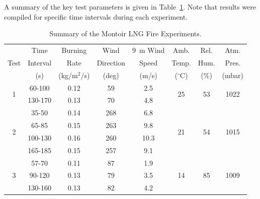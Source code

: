 A summary of the key test parameters is given in Table~\ref{Montoir_Summary}. Note that results were compiled for specific time intervals during each experiment.

\begin{table}[!ht]
\centering
\caption[Summary of the Montoir LNG Fire Experiments]{Summary of the Montoir LNG Fire Experiments.}
\label{Montoir_Summary}
\begin{tabular}{|c|c|c|c|c|c|c|c|}
\hline
                            & Time    & Burning      & Wind      & 9~m Wind & Amb.                & Rel.                & Atm.                    \\
Test                        & Interval& Rate         & Direction & Speed    & Temp.               & Hum.                & Pres.                   \\
                            & (s)     & (kg/m$^2$/s) & (deg)     & (m/s)    & ($^\circ$C)         & (\%)                & (mbar)                  \\ \hline \hline
\multirow{2}{*}{1}          & 60-100  & 0.12         & 59        & 2.5      & \multirow{2}{*}{25} & \multirow{2}{*}{53} & \multirow{2}{*}{1022}   \\
                            & 130-170 & 0.13         & 70        & 4.8      &                     &                     &                         \\ \hline
\multirow{4}{*}{2}          & 35-50   & 0.14         & 268       & 6.8      & \multirow{4}{*}{21} & \multirow{4}{*}{54} & \multirow{4}{*}{1015}   \\
                            & 65-85   & 0.15         & 263       & 9.8      &                     &                     &                         \\
                            & 100-130 & 0.16         & 260       & 10.3     &                     &                     &                         \\
                            & 165-185 & 0.15         & 257       & 9.1      &                     &                     &                         \\ \hline
\multirow{3}{*}{3}          & 57-70   & 0.11         & 87        & 1.9      & \multirow{3}{*}{14} & \multirow{3}{*}{85} & \multirow{3}{*}{1009}   \\
                            & 90-120  & 0.13         & 79        & 3.5      &                     &                     &                         \\
                            & 130-160 & 0.13         & 82        & 4.2      &                     &                     &                         \\ \hline
\end{tabular}
\end{table}

